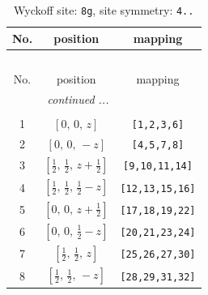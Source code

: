 \documentclass[fleqn,8pt]{jsarticle}
\begin{document}
\begin{longtable}{ccc}
\caption{Wyckoff site: {\tt 8g}, site symmetry: {\tt 4..}}
 \\
 \hline \hline
No. & position & mapping \\ \hline \endfirsthead

\multicolumn{2}{l}{\tablename\ \thetable{}} \\
 \hline \hline
No. & position & mapping \\ \hline \endhead

 \hline \hline
\multicolumn{2}{r}{\footnotesize\it continued ...} \\ \endfoot

 \hline \hline
\multicolumn{2}{r}{} \\ \endlastfoot

1 & $\left[ 0,\, 0,\, z \right]$ & {\tt [1,2,3,6]} \\ \hline
2 & $\left[ 0,\, 0,\, - z \right]$ & {\tt [4,5,7,8]} \\ \hline
3 & $\left[ \frac{1}{2},\, \frac{1}{2},\, z + \frac{1}{2} \right]$ & {\tt [9,10,11,14]} \\ \hline
4 & $\left[ \frac{1}{2},\, \frac{1}{2},\, \frac{1}{2} - z \right]$ & {\tt [12,13,15,16]} \\ \hline
5 & $\left[ 0,\, 0,\, z + \frac{1}{2} \right]$ & {\tt [17,18,19,22]} \\ \hline
6 & $\left[ 0,\, 0,\, \frac{1}{2} - z \right]$ & {\tt [20,21,23,24]} \\ \hline
7 & $\left[ \frac{1}{2},\, \frac{1}{2},\, z \right]$ & {\tt [25,26,27,30]} \\ \hline
8 & $\left[ \frac{1}{2},\, \frac{1}{2},\, - z \right]$ & {\tt [28,29,31,32]} \\
\end{longtable}
\renewcommand{\arraystretch}{1.2}
\end{document}
